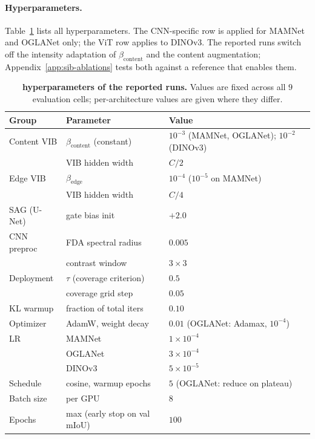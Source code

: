 \paragraph{Hyperparameters.} Table~\ref{tab:sib-hparams} lists all hyperparameters. The CNN-specific row is applied for MAMNet and OGLANet only; the ViT row applies to DINOv3. The reported \sib{} runs switch off the intensity adaptation of $\beta_{\text{content}}$ and the content augmentation; Appendix~\ref{app:sib-ablations} tests both against a reference that enables them.

\begin{table}[h]
\centering
\small
\setlength{\tabcolsep}{6pt}
\caption{\textbf{\sib{} hyperparameters of the reported runs.} Values are fixed across all $9$ evaluation cells; per-architecture values are given where they differ.}
\label{tab:sib-hparams}
\begin{tabular}{lll}
\toprule
\textbf{Group} & \textbf{Parameter} & \textbf{Value} \\
\midrule
Content VIB    & $\beta_{\text{content}}$ (constant) & $10^{-3}$ (MAMNet, OGLANet); $10^{-2}$ (DINOv3) \\
               & VIB hidden width             & $C/2$ \\
Edge VIB       & $\beta_{\text{edge}}$        & $10^{-4}$ ($10^{-5}$ on MAMNet) \\
               & VIB hidden width             & $C/4$ \\
SAG (U-Net)    & gate bias init               & $+2.0$ \\
CNN preproc    & FDA spectral radius          & $0.005$ \\
               & contrast window              & $3{\times}3$ \\
Deployment     & $\tau$ (coverage criterion)  & $0.5$ \\
               & coverage grid step           & $0.05$ \\
KL warmup      & fraction of total iters      & $0.10$ \\
\midrule
Optimizer      & AdamW, weight decay          & $0.01$ (OGLANet: Adamax, $10^{-4}$) \\
LR             & MAMNet                       & $1\!\times\!10^{-4}$ \\
               & OGLANet                      & $3\!\times\!10^{-4}$ \\
               & DINOv3                       & $5\!\times\!10^{-5}$ \\
Schedule       & cosine, warmup epochs        & $5$ (OGLANet: reduce on plateau) \\
Batch size     & per GPU                      & $8$ \\
Epochs         & max (early stop on val mIoU) & $100$ \\
\bottomrule
\end{tabular}
\end{table}

